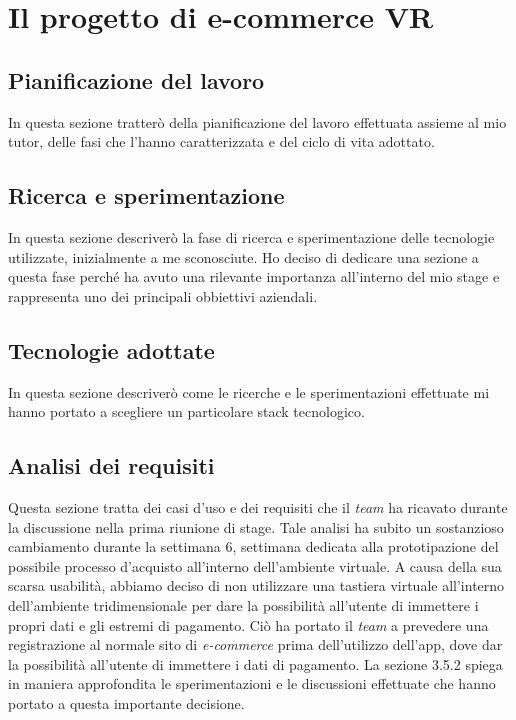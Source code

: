 \newpage

\chapter{Il progetto di e-commerce VR}
\label{cap:ilprogettoe-commercevr}

\section{Pianificazione del lavoro}

In questa sezione tratterò della pianificazione del lavoro effettuata assieme al mio tutor, delle fasi che l'hanno caratterizzata e del ciclo di vita adottato. 

\section{Ricerca e sperimentazione}

In questa sezione descriverò la fase di ricerca e sperimentazione delle tecnologie utilizzate, inizialmente a me sconosciute. Ho deciso di dedicare una sezione a questa fase perché ha avuto una rilevante importanza all'interno del mio stage e rappresenta uno dei principali obbiettivi aziendali.

\section{Tecnologie adottate}

In questa sezione descriverò come le ricerche e le sperimentazioni effettuate mi hanno portato a scegliere un particolare stack tecnologico.

\section{Analisi dei requisiti}

Questa sezione tratta dei casi d'uso e dei requisiti che il \textit{team} ha ricavato durante la discussione nella prima riunione di stage. Tale analisi ha subito un sostanzioso cambiamento durante la settimana 6, settimana dedicata alla prototipazione del possibile processo d'acquisto all'interno dell'ambiente virtuale. A causa della sua scarsa usabilità, abbiamo deciso di non utilizzare una tastiera virtuale all'interno dell'ambiente tridimensionale per dare la possibilità all'utente di immettere i propri dati e gli estremi di pagamento. Ciò ha portato il \textit{team} a prevedere una registrazione al normale sito di \textit{e-commerce} prima dell'utilizzo dell'app, dove dar la possibilità all'utente di immettere i dati di pagamento. La sezione 3.5.2 spiega in maniera approfondita le sperimentazioni e le discussioni effettuate che hanno portato a questa importante decisione. 


